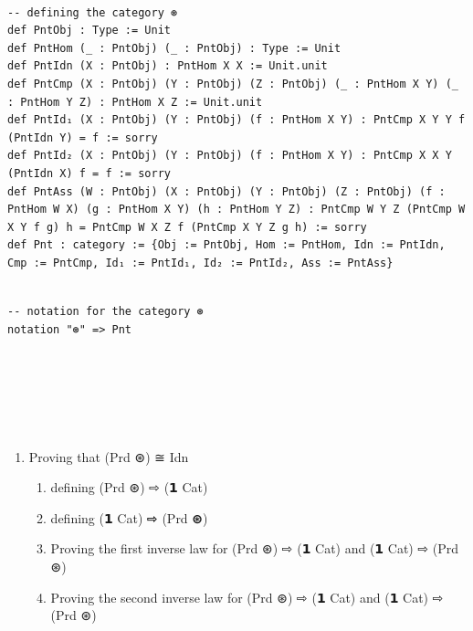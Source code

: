 \documentclass{book}
\newcounter{lcounter}
\newcounter{sectioncount}
\newcounter{subsectioncount}
\renewcommand{\section}[1]{\newpage
\ \\
\ \\
 \begin{center} \scalebox{1.5}{\texttt{\thesectioncount . #1}} \setcounter{sectioncount}{\thesectioncount+1} \setcounter{subsectioncount}{1} \end{center}
 \begin{center}

\ \\
\ \\

\thispagestyle{empty}
\end{center}
}
\begin{document}
\begin{center}
\begin{tcolorbox}[width=5in,colback={white},title={\begin{center}\texttt{Lean \thelcounter} \addtocounter{lcounter}{1}  \end{center}},colbacktitle=Blue,coltitle=black]
\begin{verbatim}

-- defining the category ⊛
def PntObj : Type := Unit
def PntHom (_ : PntObj) (_ : PntObj) : Type := Unit
def PntIdn (X : PntObj) : PntHom X X := Unit.unit
def PntCmp (X : PntObj) (Y : PntObj) (Z : PntObj) (_ : PntHom X Y) (_ : PntHom Y Z) : PntHom X Z := Unit.unit
def PntId₁ (X : PntObj) (Y : PntObj) (f : PntHom X Y) : PntCmp X Y Y f (PntIdn Y) = f := sorry
def PntId₂ (X : PntObj) (Y : PntObj) (f : PntHom X Y) : PntCmp X X Y (PntIdn X) f = f := sorry
def PntAss (W : PntObj) (X : PntObj) (Y : PntObj) (Z : PntObj) (f : PntHom W X) (g : PntHom X Y) (h : PntHom Y Z) : PntCmp W Y Z (PntCmp W X Y f g) h = PntCmp W X Z f (PntCmp X Y Z g h) := sorry
def Pnt : category := {Obj := PntObj, Hom := PntHom, Idn := PntIdn, Cmp := PntCmp, Id₁ := PntId₁, Id₂ := PntId₂, Ass := PntAss}

\end{verbatim}%
\end{tcolorbox}
\end{center}


\begin{center}
\begin{tcolorbox}[width=5in,colback={white},title={\begin{center}\texttt{Lean \thelcounter} \addtocounter{lcounter}{1}  \end{center}},colbacktitle=Green,coltitle=black]
\begin{verbatim}

-- notation for the category ⊛
notation "⊛" => Pnt

\end{verbatim}%
\end{tcolorbox}
\end{center}


\section{\texttt{Prd ⊛ ≅ 𝟭 Cat}} %

\begin{enumerate}
\item Proving that (Prd ⊛) ≅ Idn
\begin{enumerate}
\item defining (Prd ⊛) ⇨ (𝟭 Cat)
\item defining (𝟭 Cat) ⇨ (Prd ⊛)
\item Proving the first inverse law for (Prd ⊛) ⇨ (𝟭 Cat) and (𝟭 Cat) ⇨ (Prd ⊛)
\item Proving the second inverse law for (Prd ⊛) ⇨ (𝟭 Cat) and (𝟭 Cat) ⇨ (Prd ⊛)
\end{enumerate}
\end{enumerate}
\end{document}
